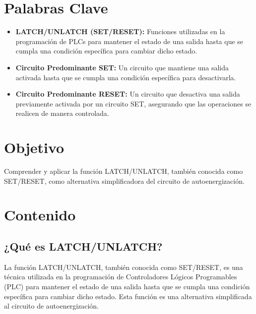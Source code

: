 \documentclass[12pt]{report}
\begin{document}
\tableofcontents
\newpage

\chapter*{Palabras Clave}

\begin{itemize}
  \item \textbf{LATCH/UNLATCH (SET/RESET):} Funciones utilizadas en la programación de PLCs para mantener el estado de una salida hasta que se cumpla una condición específica para cambiar dicho estado.
  \item \textbf{Circuito Predominante SET:} Un circuito que mantiene una salida activada hasta que se cumpla una condición específica para desactivarla.
  \item \textbf{Circuito Predominante RESET:} Un circuito que desactiva una salida previamente activada por un circuito SET, asegurando que las operaciones se realicen de manera controlada.
\end{itemize}


\newpage

\chapter*{Objetivo}
  Comprender y aplicar la función LATCH/UNLATCH, también conocida como SET/RESET, como alternativa simplificadora del circuito de autoenergización.
\newpage

\chapter{Contenido}
\section{¿Qué es LATCH/UNLATCH?}
La función LATCH/UNLATCH, también conocida como SET/RESET, es una técnica utilizada en la programación de Controladores Lógicos Programables (PLC) para mantener el estado de una salida hasta que se cumpla una condición específica para cambiar dicho estado. Esta función es una alternativa simplificada al circuito de autoenergización.
\end{document}
